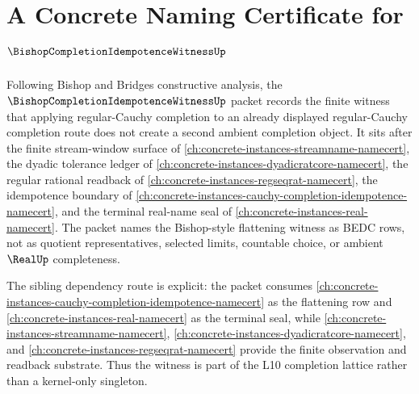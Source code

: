 \chapter{A Concrete Naming Certificate for $\BishopCompletionIdempotenceWitnessUp$}
\label{ch:concrete-instances-bishop-completion-idempotence-witness-namecert}

Following Bishop and Bridges constructive analysis, the $\BishopCompletionIdempotenceWitnessUp$ packet records the finite witness that applying regular-Cauchy completion to an already displayed regular-Cauchy completion route does not create a second ambient completion object. It sits after the finite stream-window surface of \autoref{ch:concrete-instances-streamname-namecert}, the dyadic tolerance ledger of \autoref{ch:concrete-instances-dyadicratcore-namecert}, the regular rational readback of \autoref{ch:concrete-instances-regseqrat-namecert}, the idempotence boundary of \autoref{ch:concrete-instances-cauchy-completion-idempotence-namecert}, and the terminal real-name seal of \autoref{ch:concrete-instances-real-namecert}. The packet names the Bishop-style flattening witness as BEDC rows, not as quotient representatives, selected limits, countable choice, or ambient $\RealUp$ completeness.

The sibling dependency route is explicit: the packet consumes \autoref{ch:concrete-instances-cauchy-completion-idempotence-namecert} as the flattening row and \autoref{ch:concrete-instances-real-namecert} as the terminal seal, while \autoref{ch:concrete-instances-streamname-namecert}, \autoref{ch:concrete-instances-dyadicratcore-namecert}, and \autoref{ch:concrete-instances-regseqrat-namecert} provide the finite observation and readback substrate. Thus the witness is part of the L10 completion lattice rather than a kernel-only singleton.


